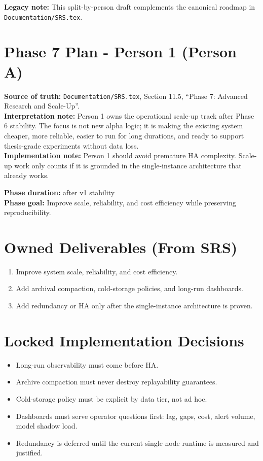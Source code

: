 \documentclass{article}
\begin{document}
\textbf{Legacy note:} This split-by-person draft complements the canonical roadmap in \texttt{Documentation/SRS.tex}.\\

\section*{Phase 7 Plan - Person 1 (Person A)}

\textbf{Source of truth:} \texttt{Documentation/SRS.tex}, Section 11.5, ``Phase 7: Advanced Research and Scale-Up''.\\
\textbf{Interpretation note:} Person 1 owns the operational scale-up track after Phase 6 stability. The focus is not new alpha logic; it is making the existing system cheaper, more reliable, easier to run for long durations, and ready to support thesis-grade experiments without data loss.\\
\textbf{Implementation note:} Person 1 should avoid premature HA complexity. Scale-up work only counts if it is grounded in the single-instance architecture that already works.

\textbf{Phase duration:} after v1 stability\\
\textbf{Phase goal:} Improve scale, reliability, and cost efficiency while preserving reproducibility.

\section*{Owned Deliverables (From SRS)}
\begin{enumerate}
\item Improve system scale, reliability, and cost efficiency.
\item Add archival compaction, cold-storage policies, and long-run dashboards.
\item Add redundancy or HA only after the single-instance architecture is proven.
\end{enumerate}

\section*{Locked Implementation Decisions}
\begin{itemize}
\item Long-run observability must come before HA.
\item Archive compaction must never destroy replayability guarantees.
\item Cold-storage policy must be explicit by data tier, not ad hoc.
\item Dashboards must serve operator questions first: lag, gaps, cost, alert volume, model shadow load.
\item Redundancy is deferred until the current single-node runtime is measured and justified.
\end{itemize}
\end{document}
